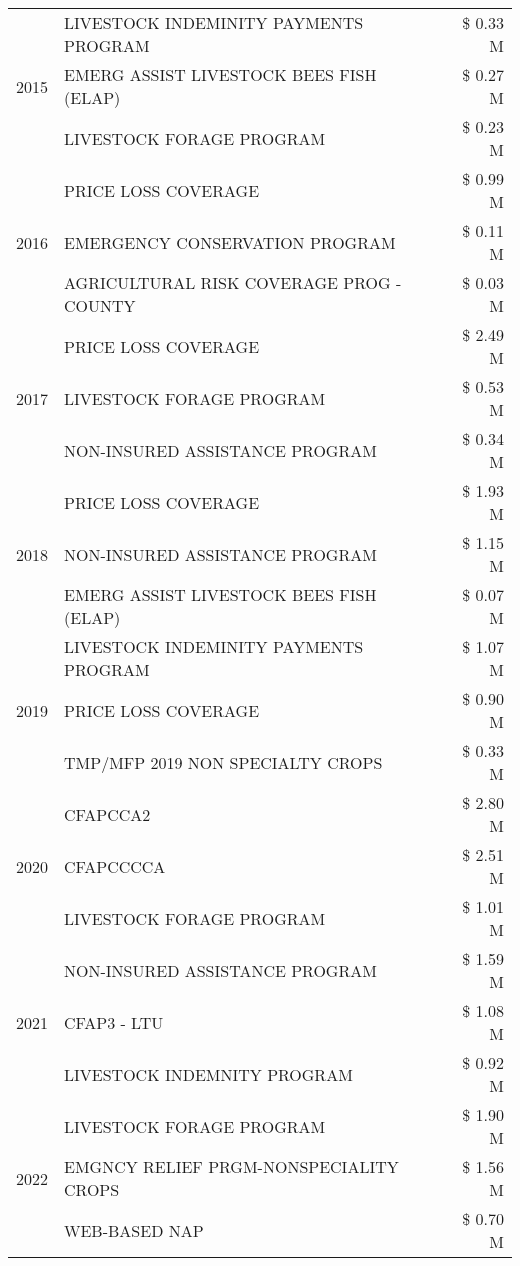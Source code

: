 \begin{tabular}{llr}
\cline{1-3}
\multirow[t]{3}{*}{2015} & LIVESTOCK INDEMINITY PAYMENTS PROGRAM & \$ 0.33 M \\
 & EMERG ASSIST LIVESTOCK BEES FISH (ELAP) & \$ 0.27 M \\
 & LIVESTOCK FORAGE PROGRAM & \$ 0.23 M \\
\cline{1-3}
\multirow[t]{3}{*}{2016} & PRICE LOSS COVERAGE & \$ 0.99 M \\
 & EMERGENCY CONSERVATION PROGRAM & \$ 0.11 M \\
 & AGRICULTURAL RISK COVERAGE PROG - COUNTY & \$ 0.03 M \\
\cline{1-3}
\multirow[t]{3}{*}{2017} & PRICE LOSS COVERAGE & \$ 2.49 M \\
 & LIVESTOCK FORAGE PROGRAM & \$ 0.53 M \\
 & NON-INSURED ASSISTANCE PROGRAM & \$ 0.34 M \\
\cline{1-3}
\multirow[t]{3}{*}{2018} & PRICE LOSS COVERAGE & \$ 1.93 M \\
 & NON-INSURED ASSISTANCE PROGRAM & \$ 1.15 M \\
 & EMERG ASSIST LIVESTOCK BEES FISH (ELAP) & \$ 0.07 M \\
\cline{1-3}
\multirow[t]{3}{*}{2019} & LIVESTOCK INDEMINITY PAYMENTS PROGRAM & \$ 1.07 M \\
 & PRICE LOSS COVERAGE & \$ 0.90 M \\
 & TMP/MFP 2019 NON SPECIALTY CROPS & \$ 0.33 M \\
\cline{1-3}
\multirow[t]{3}{*}{2020} & CFAPCCA2 & \$ 2.80 M \\
 & CFAPCCCCA & \$ 2.51 M \\
 & LIVESTOCK FORAGE PROGRAM & \$ 1.01 M \\
\cline{1-3}
\multirow[t]{3}{*}{2021} & NON-INSURED ASSISTANCE PROGRAM & \$ 1.59 M \\
 & CFAP3 - LTU & \$ 1.08 M \\
 & LIVESTOCK INDEMNITY PROGRAM & \$ 0.92 M \\
\cline{1-3}
\multirow[t]{3}{*}{2022} & LIVESTOCK FORAGE PROGRAM & \$ 1.90 M \\
 & EMGNCY RELIEF PRGM-NONSPECIALITY CROPS & \$ 1.56 M \\
 & WEB-BASED NAP & \$ 0.70 M \\
\cline{1-3}
\bottomrule
\end{tabular}
